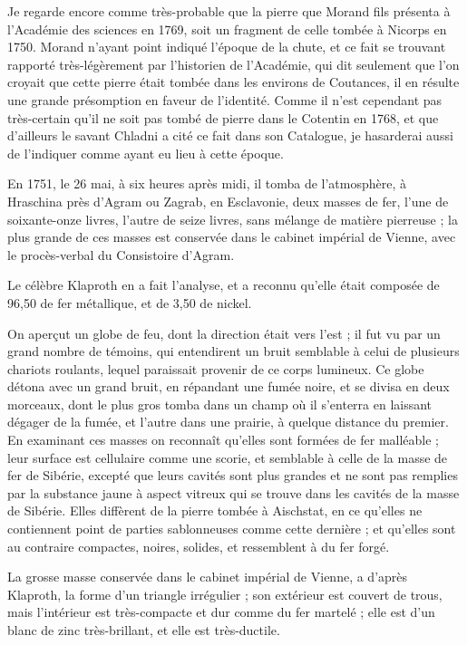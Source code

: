 \documentclass[a4paper, 12pt, oneside, french]{article}
\begin{document}
Je regarde encore comme très-probable que la pierre que Morand fils présenta à l'Académie des sciences en 1769, soit un fragment de celle tombée à Nicorps en 1750. Morand n'ayant point indiqué l'époque de la chute, et ce fait se trouvant rapporté très-légèrement par l'historien de l'Académie, qui dit seulement que l'on croyait que cette pierre était tombée dans les environs de Coutances, il en résulte une grande présomption en faveur de l'identité. Comme il n'est cependant pas très-certain qu'il ne soit pas tombé de pierre dans le Cotentin en 1768, et que d'ailleurs le savant Chladni a cité ce fait dans son Catalogue, je hasarderai aussi de l'indiquer comme ayant eu lieu à cette époque.

En 1751, le 26 mai, à six heures après midi, il tomba de l'atmosphère, à Hraschina près d'Agram ou Zagrab, en Esclavonie, deux masses de fer, l'une de soixante-onze livres, l'autre de seize livres, sans mélange de matière pierreuse ; la plus grande de ces masses est conservée dans le cabinet impérial de Vienne, avec le procès-verbal du Consistoire d'Agram.

Le célèbre Klaproth en a fait l'analyse, et a reconnu qu'elle était composée de 96,50 de fer métallique, et de 3,50 de nickel.

On aperçut un globe de feu, dont la direction était vers l'est ; il fut vu par un grand nombre de témoins, qui entendirent un bruit semblable à celui de plusieurs chariots roulants, lequel paraissait provenir de ce corps lumineux. Ce globe détona avec un grand bruit, en répandant une fumée noire, et se divisa en deux morceaux, dont le plus gros tomba dans un champ où il s'enterra en laissant dégager de la fumée, et l'autre dans une prairie, à quelque distance du premier. En examinant ces masses on reconnaît qu'elles sont formées de fer malléable ; leur surface est cellulaire comme une scorie, et semblable à celle de la masse de fer de Sibérie, excepté que leurs cavités sont plus grandes et ne sont pas remplies par la substance jaune à aspect vitreux qui se trouve dans les cavités de la masse de Sibérie. Elles diffèrent de la pierre tombée à Aischstat, en ce qu'elles ne contiennent point de parties sablonneuses comme cette dernière ; et qu'elles sont au contraire compactes, noires, solides, et ressemblent à du fer forgé.

La grosse masse conservée dans le cabinet impérial de Vienne, a d'après Klaproth, la forme d'un triangle irrégulier ; son extérieur est couvert de trous, mais l'intérieur est très-compacte et dur comme du fer martelé ; elle est d'un blanc de zinc très-brillant, et elle est très-ductile.
\end{document}
